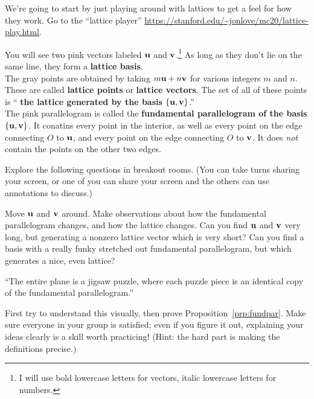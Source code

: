 \noindent
We're going to start by just playing around with lattices to get a feel for how they work. Go to the ``lattice player'' \url{https://stanford.edu/~jonlove/mc20/lattice-play.html}.

\begin{defns}
	You will see two pink vectors labeled {\color{magenta}$\mathbf{u}$} and {\color{magenta}$\mathbf{v}$}.\footnote{I will use bold lowercase letters for vectors, italic lowercase letters for numbers.} As long as they don't lie on the same line, they form a \textbf{\color{magenta} lattice basis}.
	\\
	
	The gray points are obtained by taking $m\mathbf{u}+n\mathbf{v}$ for various integers $m$ and $n$. These are called \textbf{\color{gray} lattice points} or \textbf{\color{gray} lattice vectors}. The set of all of these points is ``\textbf{\color{gray} the lattice generated by \color{magenta} the basis $\{\mathbf{u},\mathbf{v}\}$}.''
	\\
	
	The pink parallelogram is called the \textbf{\color{magenta} fundamental parallelogram of the basis $\{\mathbf{u},\mathbf{v}\}$}. It conatins every point in the interior, as well as every point on the edge connecting $O$ to $\mathbf{u}$, and every point on the edge connecting $O$ to $\mathbf{v}$. It does \emph{not} contain the points on the other two edges.
\end{defns}

Explore the following questions in breakout rooms. (You can take turns sharing your screen, or one of you can share your screen and the others can use annotations to discuss.)

\begin{explor}
	Move $\mathbf{u}$ and $\mathbf{v}$ around. Make observations about how the fundamental parallelogram changes, and how the lattice changes.  Can you find $\mathbf{u}$ and $\mathbf{v}$ very long, but generating a nonzero lattice vector which is very short? Can you find a basis with a really funky stretched out fundamental parallelogram, but which generates a nice, even lattice?
\end{explor}

\begin{explor}
	``The entire plane is a jigsaw puzzle, where each puzzle piece is an identical copy of the fundamental parallelogram.'' 
	
	First try to understand this visually, then prove Proposition~\ref{prp:fundpar}. Make sure everyone in your group is satisfied; even if you figure it out, explaining your ideas clearly is a skill worth practicing! \color{DarkGreen}(Hint: the hard part is making the definitions precise.)
\end{explor}


